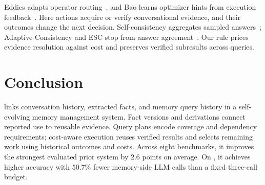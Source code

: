 Eddies adapts operator routing~\cite{eddies}, and Bao learns optimizer
hints from execution feedback~\cite{bao}. Here actions acquire or verify
conversational evidence, and their outcomes change the next decision.
Self-consistency aggregates sampled
answers~\cite{sc}; Adaptive-Consistency and ESC stop from answer
agreement~\cite{adaptiveconsistency,escsc}. Our rule prices evidence
resolution against cost and preserves verified subresults across queries.

\section{Conclusion}
\label{sec:conclusion}

\sys{} links conversation history, extracted facts, and memory query
history in a self-evolving memory management system. Fact versions
and derivations connect reported use to reusable evidence.
Query plans encode coverage and dependency requirements; cost-aware
execution reuses verified results and selects remaining work using
historical outcomes and costs. Across eight benchmarks, it improves the
strongest evaluated prior system by $2.6$ points on average. On
\membench{}, it achieves higher accuracy with $50.7\%$ fewer memory-side
LLM calls than a fixed three-call budget.
